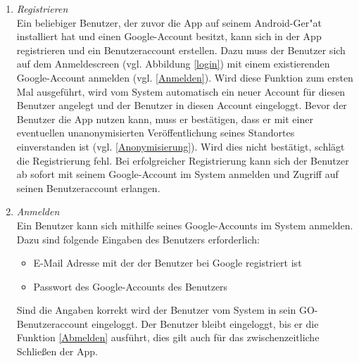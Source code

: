 \documentclass[parskip=full]{scrartcl}
\def\threedigits#1{%
  \ifnum#1<100 0\fi
  \ifnum#1<10 0\fi
  \number#1}
\begin{document}
\begin{enumerate}[label={\textbf{/F\protect\threedigits{\theenumi}0/}}, leftmargin=*]
	
	\item \textit{Registrieren}\label{Registrieren} \\ Ein beliebiger Benutzer, der zuvor die App auf seinem Android-Ger"at installiert hat und einen Google-Account besitzt, kann sich in der App registrieren und ein Benutzeraccount erstellen. Dazu muss der Benutzer sich auf dem Anmeldescreen (vgl. Abbildung \ref{login}) mit einem existierenden Google-Account anmelden (vgl. \ref{Anmelden}). Wird diese Funktion zum ersten Mal ausgeführt, wird vom System automatisch ein neuer Account für diesen Benutzer angelegt und der Benutzer in diesen Account eingeloggt. Bevor der Benutzer die App nutzen kann, muss er bestätigen, dass er mit einer eventuellen unanonymisierten Veröffentlichung seines Standortes einverstanden ist (vgl. \ref{Anonymisierung}). Wird dies nicht bestätigt, schlägt die Registrierung fehl.
	Bei erfolgreicher Registrierung kann sich der Benutzer ab sofort mit seinem Google-Account im System anmelden und Zugriff auf seinen Benutzeraccount erlangen.

	 	
	\item \textit{Anmelden} \label{Anmelden} \\ Ein Benutzer kann sich mithilfe seines Google-Accounts im System anmelden. Dazu sind folgende Eingaben des Benutzers erforderlich:
	\begin{itemize}
		\item E-Mail Adresse mit der der Benutzer bei Google registriert ist
		\item Passwort des Google-Accounts des Benutzers
	\end{itemize}
	Sind die Angaben korrekt wird der Benutzer vom System in sein GO-Benutzeraccount eingeloggt. Der Benutzer bleibt eingeloggt, bis er die Funktion \ref{Abmelden} ausführt, dies gilt auch für das zwischenzeitliche Schließen der App.
	
	

\end{enumerate}
\end{document}
